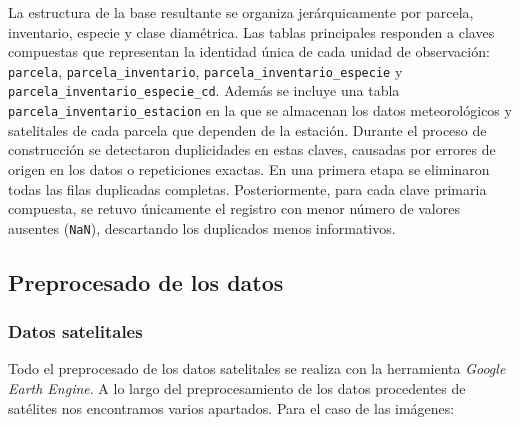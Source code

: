 \medskip

La estructura de la base resultante se organiza jerárquicamente por parcela, inventario,  especie y clase diamétrica. Las tablas principales responden a claves compuestas que representan la identidad única de cada unidad de observación: \texttt{parcela}, \texttt{parcela\_inventario}, \texttt{parcela\_inventario\_especie} y \texttt{parcela\_inventario\_especie\_cd}. Además se incluye una tabla \texttt{parcela\_inventario\_estacion} en la que se almacenan los datos meteorológicos y satelitales de cada parcela que dependen de la estación. Durante el proceso de construcción se detectaron duplicidades en estas claves, causadas por errores de origen en los datos o repeticiones exactas. En una primera etapa se eliminaron todas las filas duplicadas completas. Posteriormente, para cada clave primaria compuesta, se retuvo únicamente el registro con menor número de valores ausentes (\texttt{NaN}), descartando los duplicados menos informativos.


\subsection{Preprocesado de los datos}

\subsubsection{Datos satelitales}

Todo el preprocesado de los datos satelitales se realiza con la herramienta \textit{Google Earth Engine}. A lo largo del preprocesamiento de los datos procedentes de satélites nos encontramos varios apartados. Para el caso de las imágenes:

